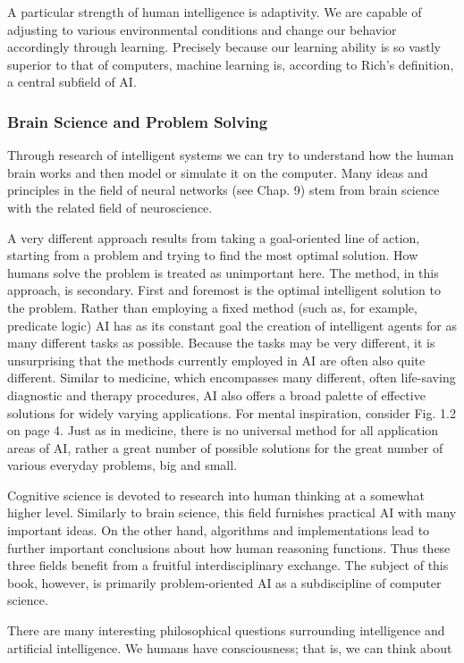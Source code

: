 \documentclass[10pt]{article}
\begin{document}
A particular strength of human intelligence is adaptivity. We are capable of adjusting to various environmental conditions and change our behavior accordingly through learning. Precisely because our learning ability is so vastly superior to that of computers, machine learning is, according to Rich's definition, a central subfield of AI.

\subsubsection*{Brain Science and Problem Solving}
Through research of intelligent systems we can try to understand how the human brain works and then model or simulate it on the computer. Many ideas and principles in the field of neural networks (see Chap. 9) stem from brain science with the related field of neuroscience.

A very different approach results from taking a goal-oriented line of action, starting from a problem and trying to find the most optimal solution. How humans solve the problem is treated as unimportant here. The method, in this approach, is secondary. First and foremost is the optimal intelligent solution to the problem. Rather than employing a fixed method (such as, for example, predicate logic) AI has as its constant goal the creation of intelligent agents for as many different tasks as possible. Because the tasks may be very different, it is unsurprising that the methods currently employed in AI are often also quite different. Similar to medicine, which encompasses many different, often life-saving diagnostic and therapy procedures, AI also offers a broad palette of effective solutions for widely varying applications. For mental inspiration, consider Fig. 1.2 on page 4. Just as in medicine, there is no universal method for all application areas of AI, rather a great number of possible solutions for the great number of various everyday problems, big and small.

Cognitive science is devoted to research into human thinking at a somewhat higher level. Similarly to brain science, this field furnishes practical AI with many important ideas. On the other hand, algorithms and implementations lead to further important conclusions about how human reasoning functions. Thus these three fields benefit from a fruitful interdisciplinary exchange. The subject of this book, however, is primarily problem-oriented AI as a subdiscipline of computer science.

There are many interesting philosophical questions surrounding intelligence and artificial intelligence. We humans have consciousness; that is, we can think about
\end{document}
